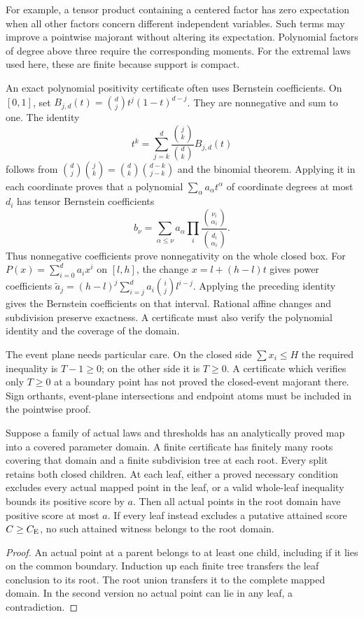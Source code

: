 For example, a tensor product containing a centered factor has zero
expectation when all other factors concern different independent variables.
Such terms may improve a pointwise majorant without altering its expectation.
Polynomial factors of degree above three require the corresponding moments.
For the extremal laws used here, these are finite because support is compact.

An exact polynomial positivity certificate often uses Bernstein coefficients.
On $[0,1]$, set $B_{j,d}(t)=\binom dj t^j(1-t)^{d-j}$. They are
nonnegative and sum to one. The identity
\[
 t^k=\sum_{j=k}^d\frac{\binom jk}{\binom dk}B_{j,d}(t)
\]
follows from
$\binom dj\binom jk=\binom dk\binom{d-k}{j-k}$ and the binomial theorem.
Applying it in each coordinate proves that a polynomial
$\sum_\alpha a_\alpha t^\alpha$ of coordinate degrees at most $d_i$ has
tensor Bernstein coefficients
\[
 b_\nu=\sum_{\alpha\le\nu}a_\alpha
                      \prod_i\frac{\binom{\nu_i}{\alpha_i}}
                                      {\binom{d_i}{\alpha_i}}.
\]
Thus nonnegative coefficients prove nonnegativity on the whole closed box.
For $P(x)=\sum_{i=0}^d a_i x^i$ on $[l,h]$, the change
$x=l+(h-l)t$ gives power coefficients
$\widetilde a_j=(h-l)^j\sum_{i=j}^d a_i\binom ij l^{i-j}$.
Applying the preceding identity gives the Bernstein coefficients on that
interval. Rational affine changes and subdivision preserve exactness. A certificate must also verify the polynomial identity and the coverage
of the domain.

The event plane needs particular care. On the closed side
$\sum x_i\le H$ the required inequality is $T-1\ge0$; on the other side
it is $T\ge0$. A certificate which verifies only $T\ge0$ at a boundary
point has not proved the closed-event majorant there. Sign orthants,
event-plane intersections and endpoint atoms must be included in the
pointwise proof.

\begin{proposition}
\label{ms:closed-cover}
Suppose a family of actual laws and thresholds has an analytically proved
map into a covered parameter domain. A finite certificate has finitely
many roots covering that domain and a finite subdivision tree at each
root. Every split retains both closed children. At each leaf, either
a proved necessary condition excludes every actual mapped point in the
leaf, or a valid whole-leaf inequality bounds its positive score by $a$.
Then all actual points in the root domain have positive score at most $a$.
If every leaf instead excludes a putative attained score $C\ge C_{\mathrm E}$, no
such attained witness belongs to the root domain.
\end{proposition}
\begin{proof}
An actual point at a parent belongs to at least one child, including if it
lies on the common boundary. Induction up each finite tree transfers the
leaf conclusion to its root. The root union transfers it to the complete
mapped domain. In the second version no actual point can lie in any leaf, a
contradiction.
\end{proof}

